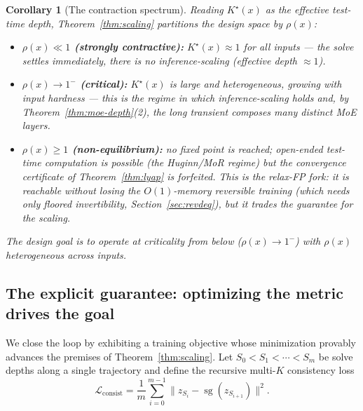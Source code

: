 \documentclass[11pt]{article}
\newtheorem{corollary}[theorem]{Corollary}
\newcommand{\stopgrad}{\operatorname{sg}}
\begin{document}
\begin{corollary}[The contraction spectrum]
\label{cor:spectrum}
Reading $K^\star(x)$ as the effective test-time depth, Theorem~\ref{thm:scaling} partitions
the design space by $\rho(x)$:
\begin{itemize}[leftmargin=2em,itemsep=0.2em]
  \item \textbf{$\rho(x)\ll1$ (strongly contractive):} $K^\star(x)\approx1$ for all inputs ---
    the solve settles immediately, there is \emph{no} inference-scaling (effective depth
    $\approx1$).
  \item \textbf{$\rho(x)\to1^-$ (critical):} $K^\star(x)$ is large and \emph{heterogeneous},
    growing with input hardness --- this is the regime in which inference-scaling holds and,
    by Theorem~\ref{thm:moe-depth}(2), the long transient composes many distinct MoE layers.
  \item \textbf{$\rho(x)\ge1$ (non-equilibrium):} no fixed point is reached; open-ended
    test-time computation is possible (the Huginn/MoR regime) but the convergence certificate
    of Theorem~\ref{thm:lyap} is forfeited.  This is the \emph{relax-FP fork}: it is reachable
    without losing the $O(1)$-memory reversible training (which needs only floored
    invertibility, Section~\ref{sec:revdeq}), but it trades the guarantee for the scaling.
\end{itemize}
The design goal is to operate at criticality from below ($\rho(x)\to1^-$) with $\rho(x)$
heterogeneous across inputs.
\end{corollary}

\subsection{The explicit guarantee: optimizing the metric drives the goal}
\label{sec:guarantee}

We close the loop by exhibiting a training objective whose minimization provably advances
the premises of Theorem~\ref{thm:scaling}.  Let $S_0<S_1<\cdots<S_m$ be solve depths along a
single trajectory and define the recursive multi-$K$ consistency loss
\begin{equation}
  \mathcal L_{\mathrm{consist}}
   = \frac1m\sum_{i=0}^{m-1}\bigl\|z_{S_i}-\stopgrad(z_{S_{i+1}})\bigr\|^2 .
  \label{eq:consist}
\end{equation}
\end{document}
